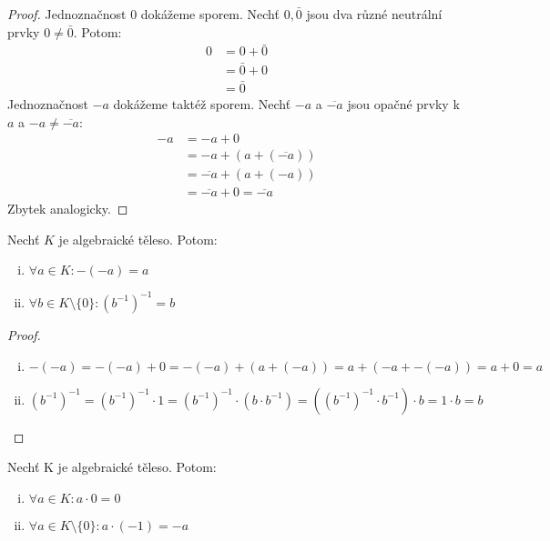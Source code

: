 \begin{proof}
    \leavevmode
        Jednoznačnost $0$ dokážeme sporem. Nechť $0, \bar{0}$ jsou dva 
            různé neutrální prvky $0 \neq \bar{0}$. Potom:
            \begin{align*}
                0 &= 0 + \bar{0} \tag{S0} \\
                  &= \bar{0} + 0 \tag{SK} \\
                  &= \bar{0} \tag{S0}
            \end{align*}
        Jednoznačnost ${-a}$ dokážeme taktéž sporem. 
        Nechť $-a$ a $\overline{-a}$ jsou opačné prvky k $a$ a 
            $-a \neq \overline{-a}$:
            \begin{align*}
                -a &= -a + 0 \tag{S0} \\
                   &= -a + (a + (\overline{-a})) \tag{SI} \\
                   &= \overline{-a} + (a + (-a)) \tag {SK, SA} \\
                   &= \overline{-a} + 0 = \overline{-a} \tag{SI, S0}
            \end{align*}
        Zbytek analogicky.
\end{proof}

\begin{observation}
    Nechť $K$ je algebraické těleso. Potom:
        \begin{enumerate}[i.]
            \item $\forall a \in K: -(-a) = a$
            \item $\forall b \in K \setminus \{0\}: (b^{-1})^{-1} = b$
        \end{enumerate}
\end{observation}

\begin{proof}
    \leavevmode
    \begin{enumerate}[i.]
        \item $-(-a) = -(-a) + 0 = -(-a) + (a + (-a)) = a + (-a + -(-a)) 
            = a + 0 = a$
        \item $(b^{-1})^{-1} = (b^{-1})^{-1} \cdot 1 = (b^{-1})^{-1} \cdot 
            (b \cdot b^{-1}) = ((b^{-1})^{-1} \cdot b^{-1}) \cdot b = 
            1 \cdot b = b$
    \end{enumerate}
\end{proof}

\begin{observation}
    Nechť K je algebraické těleso. Potom:
    \begin{enumerate}[i.]
        \item $\forall a \in K: a \cdot 0 = 0$
        \item $\forall a \in K \setminus \{0\}: a \cdot (-1) = -a$
    \end{enumerate}
\end{observation}
   
